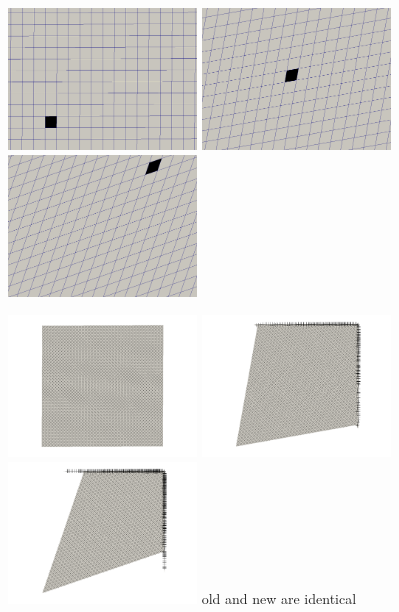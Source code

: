 \includegraphics[width=5cm]{python_codes/fieldstone_89/results/pureshear/target0000}
\includegraphics[width=5cm]{python_codes/fieldstone_89/results/pureshear/target0005}
\includegraphics[width=5cm]{python_codes/fieldstone_89/results/pureshear/target0010}

\includegraphics[width=5cm]{python_codes/fieldstone_89/results/pureshear/old_dirs0000}
\includegraphics[width=5cm]{python_codes/fieldstone_89/results/pureshear/old_dirs0005}
\includegraphics[width=5cm]{python_codes/fieldstone_89/results/pureshear/old_dirs0010}
{\captionfont old and new are identical}

